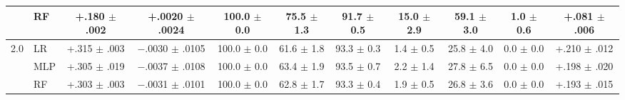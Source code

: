 \begin{table}[t]
\begin{tabular}{rl cc c cc cc c c}
 & RF & +.180 $\pm$ .002 & +.0020 $\pm$ .0024 & 100.0 $\pm$ 0.0 & 75.5 $\pm$ 1.3 & 91.7 $\pm$ 0.5 & 15.0 $\pm$ 2.9 & 59.1 $\pm$ 3.0 & 1.0 $\pm$ 0.6 & +.081 $\pm$ .006 \\
\hline
2.0 & LR & +.315 $\pm$ .003 & $-$.0030 $\pm$ .0105 & 100.0 $\pm$ 0.0 & 61.6 $\pm$ 1.8 & 93.3 $\pm$ 0.3 & 1.4 $\pm$ 0.5 & 25.8 $\pm$ 4.0 & 0.0 $\pm$ 0.0 & +.210 $\pm$ .012 \\
 & MLP & +.305 $\pm$ .019 & $-$.0037 $\pm$ .0108 & 100.0 $\pm$ 0.0 & 63.4 $\pm$ 1.9 & 93.5 $\pm$ 0.7 & 2.2 $\pm$ 1.4 & 27.8 $\pm$ 6.5 & 0.0 $\pm$ 0.0 & +.198 $\pm$ .020 \\
 & RF & +.303 $\pm$ .003 & $-$.0031 $\pm$ .0101 & 100.0 $\pm$ 0.0 & 62.8 $\pm$ 1.7 & 93.3 $\pm$ 0.4 & 1.9 $\pm$ 0.5 & 26.8 $\pm$ 3.6 & 0.0 $\pm$ 0.0 & +.193 $\pm$ .015 \\
\hline
\end{tabular}
\end{table}

